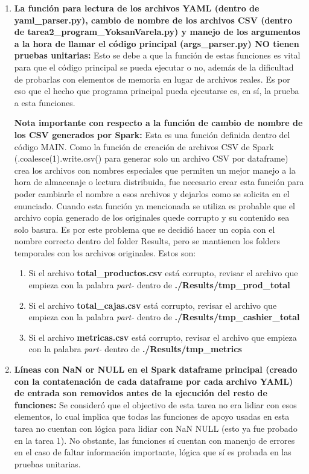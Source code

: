 \documentclass[a4paper]{article}
\begin{document}
\begin{enumerate}
    \item \textbf{La funci\'{o}n para lectura de los archivos YAML (dentro de yaml\_parser.py), cambio de nombre de los archivos CSV (dentro de tarea2\_program\_YoksanVarela.py) y manejo de los argumentos a la hora de llamar el c\'{o}digo principal (args\_parser.py) NO tienen pruebas unitarias:} Esto se debe a que la funci\'{o}n de estas funciones es vital para que el c\'{o}digo principal se pueda ejecutar o no, adem\'{a}s de la dificultad de probarlas con elementos de memoria en lugar de archivos reales. Es por eso que el hecho que programa principal pueda ejecutarse es, en s\'{i}, la prueba a esta funciones.

    \textbf{Nota importante con respecto a la funci\'{o}n de cambio de nombre de los CSV generados por Spark:} Esta es una funci\'{o}n definida dentro del c\'{o}digo MAIN. Como la funci\'{o}n de creaci\'{o}n de archivos CSV de Spark (.coalesce(1).write.csv() para generar solo un archivo CSV por dataframe) crea los archivos con nombres especiales que permiten un mejor manejo a la hora de almacenaje o lectura distribuida, fue necesario crear esta funci\'{o}n para poder cambiarle el nombre a esos archivos y dejarlos como se solicita en el enunciado. Cuando esta funci\'{o}n ya mencionada se utiliza es probable que el archivo copia generado de los originales quede corrupto y su contenido sea solo basura. Es por este problema que se decidi\'{o} hacer un copia con el nombre correcto dentro del folder Results, pero se mantienen los folders temporales con los archivos originales. Estos son:
    \begin{enumerate}
        \item Si el archivo \textbf{total\_productos.csv} est\'{a} corrupto, revisar el archivo que empieza con la palabra \textit{part-} dentro de \textbf{./Results/tmp\_prod\_total}
        \item Si el archivo \textbf{total\_cajas.csv} est\'{a} corrupto, revisar el archivo que empieza con la palabra \textit{part-} dentro de \textbf{./Results/tmp\_cashier\_total}
        \item Si el archivo \textbf{metricas.csv} est\'{a} corrupto, revisar el archivo que empieza con la palabra \textit{part-} dentro de \textbf{./Results/tmp\_metrics}
    \end{enumerate}

    \item \textbf{L\'{i}neas con NaN or NULL en el Spark dataframe principal (creado con la contatenaci\'{o}n de cada dataframe por cada archivo YAML) de entrada son removidos antes de la ejecuci\'{o}n del resto de funciones:} Se consider\'{o} que el objectivo de esta tarea no era lidiar con esos elementos, lo cual implica que todas las funciones de apoyo usadas en esta tarea no cuentan con l\'{o}gica para lidiar con NaN NULL (esto ya fue probado en la tarea 1). No obstante, las funciones s\'{i} cuentan con manenjo de errores en el caso de faltar informaci\'{o}n importante, l\'{o}gica que s\'{i} es probada en las pruebas unitarias.
    

\end{enumerate}
\end{document}
